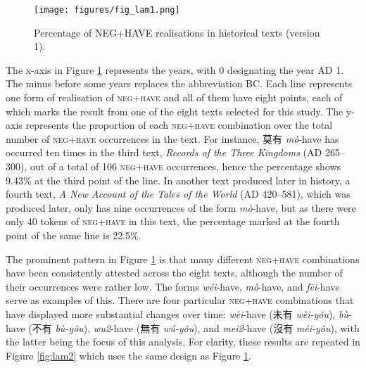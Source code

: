 \documentclass[output=paper]{langscibook}
\begin{document}
\begin{figure}
  \texttt{[image: figures/fig\_lam1.png]}
  \caption{Percentage of NEG+HAVE realisations in historical texts (version 1).}
  \label{fig:lam1}
\end{figure}

The x-axis in Figure \ref{fig:lam1} represents the years, with 0 designating the year AD 1. The minus before some years replaces the abbreviation BC. Each line represents one form of realisation of \textsc{neg}+\textsc{have} and all of them have eight points, each of which marks the result from one of the eight texts selected for this study. The y-axis represents the proportion of each \textsc{neg}+\textsc{have} combination over the total number of \textsc{neg}+\textsc{have} occurrences in the text. For instance, 莫有 \textit{mò}-have has occurred ten times in the third text, \emph{Records of the Three Kingdoms} (AD 265–300), out of a total of 106 \textsc{neg}+\textsc{have} occurrences, hence the percentage shows 9.43\% at the third point of the line. In another text produced later in history, a fourth text, \emph{A New Account of the Tales of the World} (AD 420–581), which was produced later, only has nine occurrences of the form \textit{mò}-have, but as there were only 40 tokens of \textsc{neg}+\textsc{have} in this text, the percentage marked at the fourth point of the same line is 22.5\%.

The prominent pattern in Figure \ref{fig:lam1} is that many different \textsc{neg}+\textsc{have} combinations have been consistently attested across the eight texts, although the number of their occurrences were rather low. The forms \textit{wéi}-have, \textit{mò}-have, and \textit{fēi}-have serve as examples of this. There are four particular \textsc{neg}+\textsc{have} combinations that have displayed more substantial changes over time: \textit{wèi}-have (未有 \textit{wèi-yǒu}), \textit{bù}-have (不有  \textit{bù-yǒu}), \textit{wu2}-have (無有 \textit{wú-yǒu}), and \textit{mei2}-have (沒有 \textit{méi-yǒu}), with the latter being the focus of this analysis. For clarity, these results are repeated in Figure \ref{fig:lam2} which uses the same design as Figure \ref{fig:lam1}. 
\end{document}
